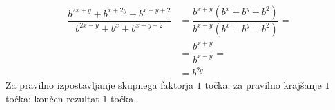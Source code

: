 \documentclass[addpoints]{exam}
\begin{document}
\begin{questions}
    \begin{solution}[7cm]
        \begin{align*}
            \dfrac{b^{2x+y}+b^{x+2y}+b^{x+y+2}}{b^{2x-y}+b^x+b^{x-y+2}} &= \dfrac{b^{x+y}(b^x+b^y+b^2)}{b^{x-y}(b^x+b^y+b^2)}= \\
                                                                        &= \dfrac{b^{x+y}}{b^{x-y}}= \\
                                                                        &= b^{2y}
        \end{align*}
        Za pravilno izpostavljanje skupnega faktorja $1$ točka; za pravilno krajšanje $1$ točka; končen rezultat $1$ točka.
    \end{solution}




\end{questions}
\end{document}
